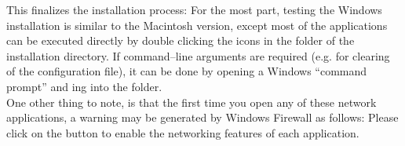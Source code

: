 \newpage



\newpage
This finalizes the installation process:
\newpage
{}
For the most part, testing the Windows installation is similar to the Macintosh version,
except most of the applications can be executed directly by double clicking the icons in
the  folder of the installation directory.
If command--line arguments are required (e.g. for clearing of the \yarp{} configuration
file), it can be done by opening a Windows ``command prompt'' and ing into
the  folder.\\

One other thing to note, is that the first time you open any of these network
applications, a warning may be generated by Windows Firewall as follows:
Please click on the  button to enable the networking features of
each application.
\tertiaryEnd{}
\secondaryEnd{}
\TBD{}
\TBD{}
\tertiaryEnd{}
\secondaryEnd{}
\primaryEnd{}
